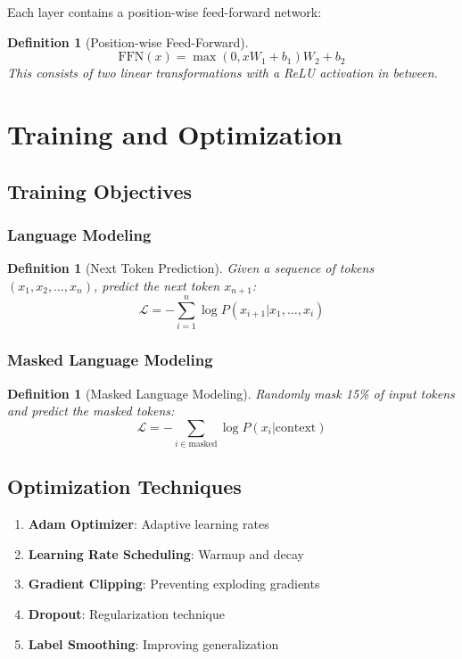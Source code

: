 \documentclass[11pt,a4paper]{article}
\newtheorem{definition}[theorem]{Definition}
\begin{document}
Each layer contains a position-wise feed-forward network:

\begin{definition}[Position-wise Feed-Forward]
$$\text{FFN}(x) = \max(0, xW_1 + b_1)W_2 + b_2$$
This consists of two linear transformations with a ReLU activation in between.
\end{definition}

\section{Training and Optimization}

\subsection{Training Objectives}

\subsubsection{Language Modeling}

\begin{definition}[Next Token Prediction]
Given a sequence of tokens $(x_1, x_2, \ldots, x_n)$, predict the next token $x_{n+1}$:
$$\mathcal{L} = -\sum_{i=1}^{n} \log P(x_{i+1} | x_1, \ldots, x_i)$$
\end{definition}

\subsubsection{Masked Language Modeling}

\begin{definition}[Masked Language Modeling]
Randomly mask 15\% of input tokens and predict the masked tokens:
$$\mathcal{L} = -\sum_{i \in \text{masked}} \log P(x_i | \text{context})$$
\end{definition}

\subsection{Optimization Techniques}

\begin{enumerate}
\item \textbf{Adam Optimizer}: Adaptive learning rates
\item \textbf{Learning Rate Scheduling}: Warmup and decay
\item \textbf{Gradient Clipping}: Preventing exploding gradients
\item \textbf{Dropout}: Regularization technique
\item \textbf{Label Smoothing}: Improving generalization
\end{enumerate}
\end{document}
